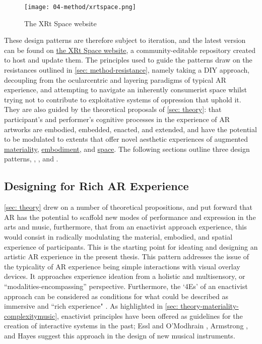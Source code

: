 \begin{figure}
    \centering
    {\texttt{[image: 04-method/xrtspace.png]}}
    \caption[The XRt Space website]{The XRt Space website}
\end{figure}\label{fig: thexrtspace}

These design patterns are therefore subject to iteration, and the latest version can be found on \href{https://www.thexrt.space}{the XRt Space website}, a community-editable repository created to host and update them. The principles used to guide the patterns draw on the resistances outlined in \autoref{sec: method-resistance}, namely taking a DIY approach, decoupling from the ocularcentric and layering paradigms of typical AR experience, and attempting to navigate an inherently consumerist space whilst trying not to contribute to exploitative systems of oppression that uphold it. They are also guided by the theoretical proposals of \autoref{sec: theory}: that participant's and performer's cognitive processes in the experience of AR artworks are embodied, embedded, enacted, and extended, and have the potential to be modulated to extents that offer novel aesthetic experiences of augmented \hyperref[sec: theory-materiality]{materiality}, \hyperref[sec: theory-embodiment]{embodiment}, and \hyperref[sec: theory-space]{space}. The following sections outline three design patterns, \textit{}, \textit{}, and \textit{}.

\subsection{Designing for Rich AR Experience} \label{sec: discussion-patterns-experience} 
\autoref{sec: theory} drew on a number of theoretical propositions, and put forward that AR has the potential to scaffold new modes of performance and expression in the arts and music, furthermore, that from an enactivist approach experience, this would consist in radically modulating the material, embodied, and spatial experience of participants. This is the starting point for ideating and designing an artistic AR experience in the present thesis. This pattern addresses the issue of the typicality of AR experience being simple interactions with visual overlay devices. It approaches experience ideation from a holistic and multisensory, or ``modalities-encompassing'' \citep{schraffenberger2018} perspective. Furthermore, the `4Es' of an enactivist approach can be considered as conditions for what could be described as immersive and ``rich experience" \citep{bilbow2021}. As highlighted in \autoref{sec: theory-materiality-complexitymusic}, enactivist principles have been offered as guidelines for the creation of interactive systems in the past; Essl and O'Modhrain \citeyearpar{essl2006}, Armstrong \citeyearpar{armstrong2006}, and Hayes \citeyearpar{hayes2019} suggest this approach in the design of new musical instruments. 

